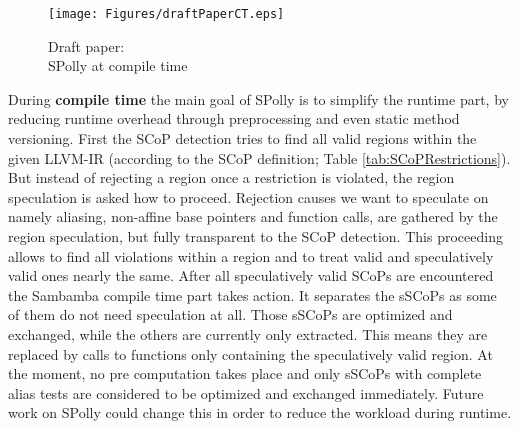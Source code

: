 \begin{figure}
  \centering
  \texttt{[image: Figures/draftPaperCT.eps]}
  \caption{Draft paper: \\SPolly at compile time}
  \vspace*{-4mm}
  \label{fig:draftPaperCT}  
\end{figure}
During \textbf{compile time} the main goal of SPolly is to simplify the runtime part,
by reducing runtime overhead through preprocessing and even static method versioning.
First the SCoP detection tries to find all valid regions within the given LLVM-IR
(according to the SCoP definition; Table \ref{tab:SCoPRestrictions}).
But instead of rejecting a region once a restriction is violated, 
the region speculation is asked how to proceed. Rejection causes we want to speculate
on namely aliasing, non-affine base pointers and function calls, 
are gathered by the region speculation, but fully transparent to the SCoP detection.
This proceeding allows to find all violations within a region and to treat valid and
speculatively valid ones nearly the same. After all  
speculatively valid SCoPs are encountered the Sambamba compile 
time part takes action. It separates the sSCoPs as some of them do not need
speculation at all. Those sSCoPs are optimized and exchanged, 
while the others are currently only extracted. This means they are replaced by
calls to functions only containing the speculatively valid region. 
At the moment, no pre computation takes place and only sSCoPs with complete
alias tests are considered to be optimized and exchanged immediately.  Future 
work on SPolly could change this in order to reduce the workload during runtime.






